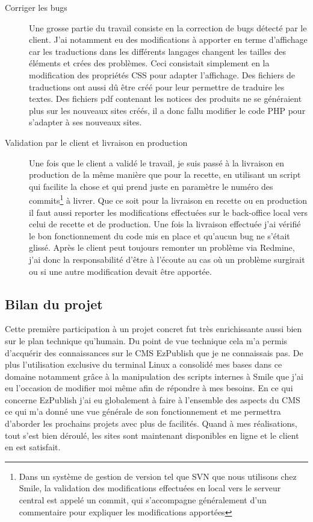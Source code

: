 \documentclass[a4paper,11pt,twoside]{report}
\begin{document}
\begin{description}
\begin{center}
	  \label{DDTH_home}
	\end{center}
	\item[Corriger les bugs] Une grosse partie du travail consiste en la correction de bugs détecté par le client. J'ai notamment eu des modifications à apporter en terme d'affichage car les traductions dans les différents langages changent les tailles des éléments et crées des problèmes. Ceci consistait simplement en la modification des propriétés CSS pour adapter l'affichage. Des fichiers de traductions ont aussi dû être créé pour leur permettre de traduire les textes. Des fichiers pdf contenant les notices des produits ne se généraient plus sur les nouveaux sites créés, il a donc fallu modifier le code PHP pour s'adapter à ses nouveaux sites. 
	\item[Validation par le client et livraison en production] Une fois que le client a validé le travail, je suis passé à la livraison en production de la même manière que pour la recette, en utilisant un script qui facilite la chose et qui prend juste en paramètre le numéro des commits\footnote{Dans un système de gestion de version tel que SVN que nous utilisons chez Smile, la validation des modifications effectuées en local vers le serveur central est appelé un commit, qui s'accompagne généralement d'un commentaire pour expliquer les modifications apportées} à livrer. Que ce soit pour la livraison en recette ou en production il faut aussi reporter les modifications effectuées sur le back-office local vers celui de recette et de production. Une fois la livraison effectuée j'ai vérifié le bon fonctionnement du code mis en place et qu'aucun bug ne s'était glissé. Après le client peut toujours remonter un problème via Redmine, j'ai donc la responsabilité d'être à l'écoute au cas où un problème surgirait ou si une autre modification devait être apportée.  
      
      \end{description}
    \subsection*{Bilan du projet}
    Cette première participation à un projet concret fut très enrichissante aussi bien sur le plan technique qu'humain. Du point de vue technique cela m'a permis d'acquérir des connaissances sur le CMS EzPublish que je ne connaissais pas. De plus l'utilisation exclusive du terminal Linux a consolidé mes bases dans ce domaine notamment grâce à la manipulation des scripts internes à Smile que j'ai eu l'occasion de modifier moi même afin de répondre à mes besoins. En ce qui concerne EzPublish j'ai eu globalement à faire à l'ensemble des aspects du CMS ce qui m'a donné une vue générale de son fonctionnement et me permettra d'aborder les prochains projets avec plus de facilités. Quand à mes réalisations, tout s'est bien déroulé, les sites sont maintenant disponibles en ligne et le client en est satisfait. 
    
\end{document}
